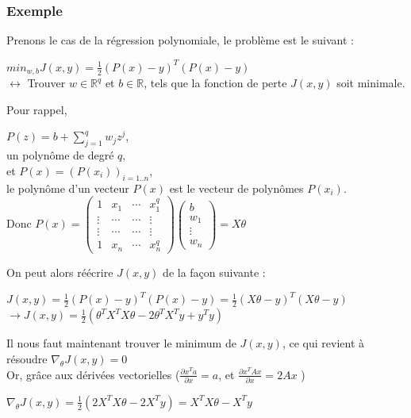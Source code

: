 \documentclass[10pt,a4paper]{report}
\begin{document}
			\subsubsection{Exemple}
			Prenons le cas de la régression polynomiale, le problème est le suivant :
			\begin{center}
				$min_{w,b} J(x,y) = \frac{1}{2} (P(x)-y)^T(P(x)-y)$\\
				$\leftrightarrow$ Trouver $w \in \mathbb{R}^q$ et $b \in \mathbb{R}$, tels que la fonction de perte $J(x,y)$ soit minimale.
			\end{center}
			Pour rappel, 
				\begin{center}
					$P(z) = b + \sum_{j=1}^{q}{w_j z^j}$,\\
					un polynôme de degré $q$,\\
					et $P(x) = (P(x_i))_{i=1..n}$,\\
					le polynôme d'un vecteur $P(x)$ est le vecteur de polynômes $P(x_i)$.\\
					Donc $P(x) = 
					\begin{pmatrix}
						1 & x_1 & \cdots & x_1^q \\ 
						\vdots & \cdots  & \cdots & \vdots \\ 
						\vdots & \cdots & \cdots & \vdots \\ 
						1 & x_n & \cdots & x_n^q
					\end{pmatrix} 
					\begin{pmatrix}
					b \\
					w_1 \\
					\vdots \\
					w_n
					\end{pmatrix}
					= X \theta
					$
				\end{center}
			On peut alors réécrire $J(x,y)$ de la façon suivante :
			\begin{center}
				$J(x,y) = \frac{1}{2} (P(x)-y)^T(P(x)-y) = \frac{1}{2} (X\theta-y)^T(X\theta-y)$\\
				$\rightarrow J(x,y) =\frac{1}{2} (\theta^TX^TX\theta - 2\theta^TX^Ty + y^Ty)$
			\end{center}
			Il nous faut maintenant trouver le minimum de $J(x,y)$, ce qui revient à résoudre $\nabla_\theta J(x,y) = 0$\\
			Or, grâce aux dérivées vectorielles ($\frac{\partial x^Ta}{\partial x} = a$, et $\frac{\partial x^TAx}{\partial x} = 2Ax$ )
			\begin{center}
				$\nabla_\theta J(x,y) = \frac{1}{2} (2X^TX\theta-2X^Ty) = X^TX\theta-X^Ty$
			\end{center}
\end{document}

